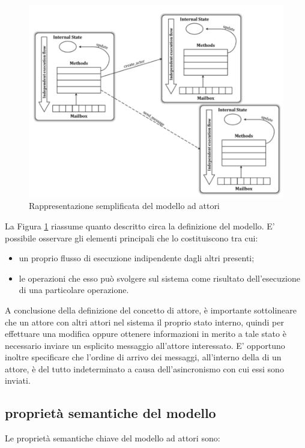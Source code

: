 \begin{figure}[h!]
\centering
\includegraphics[scale=0.4]{images/analysis/Actor-model.png}
\caption{Rappresentazione semplificata del modello ad attori}
\label{analisi-della-concorrenza-concorrenza-image-actor-model}
\end{figure}

La Figura \ref{analisi-della-concorrenza-concorrenza-image-actor-model} riassume quanto descritto circa la definizione del modello. E' possibile osservare gli elementi principali che lo costituiscono tra cui:

\begin{itemize}
\item{un proprio flusso di esecuzione indipendente dagli altri presenti;}
\item{le operazioni che esso può svolgere sul sistema come risultato dell'esecuzione di una particolare operazione.}
\end{itemize}

A conclusione della definizione del concetto di attore, è importante sottolineare che un attore  con altri attori nel sistema il proprio stato interno, quindi per effettuare una modifica oppure ottenere informazioni in merito a tale stato è necessario inviare un esplicito messaggio all'attore interessato. E' opportuno inoltre specificare che l'ordine di arrivo dei messaggi, all'interno della  di un attore, è del tutto indeterminato  a causa dell'asincronismo con cui essi sono inviati.

\subsection*{proprietà semantiche del modello}
\label{analisi-della-concorrenza-concorrenza-proprietà-semantiche-del-modello}
Le proprietà semantiche chiave del modello ad attori sono:

